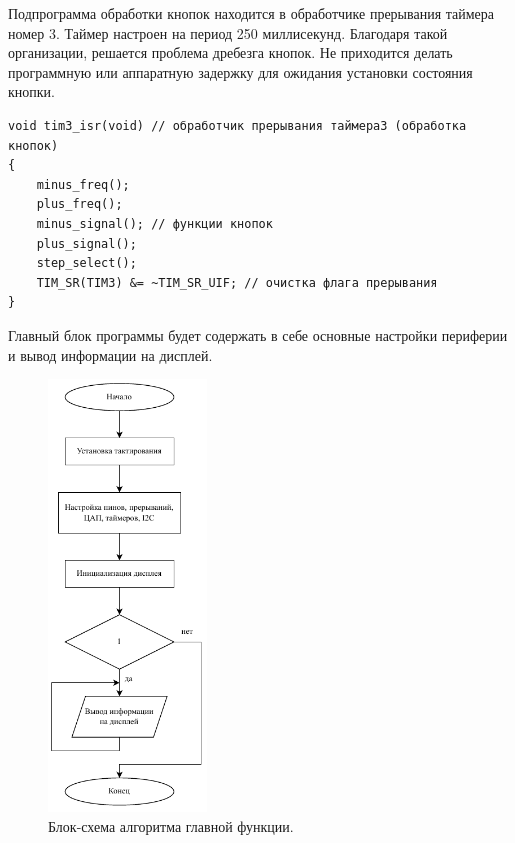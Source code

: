 	Подпрограмма обработки кнопок находится в обработчике прерывания таймера номер 3. Таймер настроен на период 250 миллисекунд. Благодаря такой организации, решается проблема дребезга кнопок. Не приходится делать программную или аппаратную задержку для ожидания установки состояния кнопки.

\begin{code}
\begin{verbatim}
void tim3_isr(void) // обработчик прерывания таймера3 (обработка кнопок)
{
    minus_freq();
    plus_freq();
    minus_signal(); // функции кнопок
    plus_signal();
    step_select();
    TIM_SR(TIM3) &= ~TIM_SR_UIF; // очистка флага прерывания
}
\end{verbatim}
\end{code}
	
	Главный блок программы будет содержать в себе основные настройки периферии и вывод информации на дисплей.
	\begin{figure}[H]
    \centering
    \includegraphics[width=0.375\textwidth]{../image/main.pdf}
    \caption{Блок-схема алгоритма главной функции.}
	\end{figure}
	
